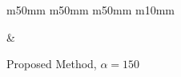 \begin{figure}[htbp]
\begin{tabular}{m{50mm} m{50mm} m{50mm} m{10mm}}
\begin{minipage}[b]{\linewidth}
            \vspace{-7mm}
            \caption*{\footnotesize Proposed Method, $\alpha = 150$}
            \vspace{1mm}
        \end{minipage} &
         \\


\end{tabular}
\end{figure}
